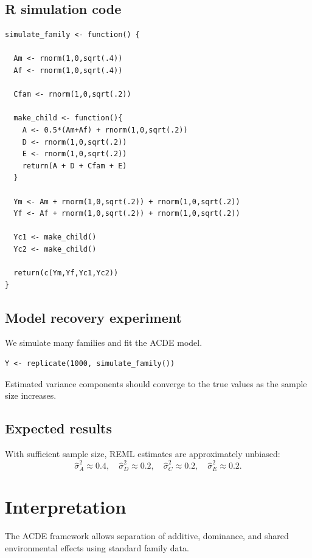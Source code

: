 \documentclass[11pt]{article}
\begin{document}
\subsection{R simulation code}

\begin{verbatim}
simulate_family <- function() {

  Am <- rnorm(1,0,sqrt(.4))
  Af <- rnorm(1,0,sqrt(.4))

  Cfam <- rnorm(1,0,sqrt(.2))

  make_child <- function(){
    A <- 0.5*(Am+Af) + rnorm(1,0,sqrt(.2))
    D <- rnorm(1,0,sqrt(.2))
    E <- rnorm(1,0,sqrt(.2))
    return(A + D + Cfam + E)
  }

  Ym <- Am + rnorm(1,0,sqrt(.2)) + rnorm(1,0,sqrt(.2))
  Yf <- Af + rnorm(1,0,sqrt(.2)) + rnorm(1,0,sqrt(.2))

  Yc1 <- make_child()
  Yc2 <- make_child()

  return(c(Ym,Yf,Yc1,Yc2))
}
\end{verbatim}

\subsection{Model recovery experiment}

We simulate many families and fit the ACDE model.

\begin{verbatim}
Y <- replicate(1000, simulate_family())
\end{verbatim}

Estimated variance components should converge to the true values as the 
sample size increases.

\subsection{Expected results}

With sufficient sample size, REML estimates are approximately unbiased:
\[
\hat{\sigma}_A^2 \approx 0.4,\quad
\hat{\sigma}_D^2 \approx 0.2,\quad
\hat{\sigma}_C^2 \approx 0.2,\quad
\hat{\sigma}_E^2 \approx 0.2.
\]

\section{Interpretation}

The ACDE framework allows separation of additive, dominance, and shared 
environmental effects using standard family data.
\end{document}
